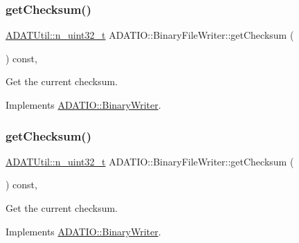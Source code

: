 \subsubsection{\texorpdfstring{getChecksum()}{getChecksum()}\hspace{0.1cm}{\footnotesize\ttfamily [2/3]}}
{\footnotesize\ttfamily \mbox{\hyperlink{namespaceADATUtil_ad945a8afa4db2d1f89b731964adae97e}{A\+D\+A\+T\+Util\+::n\+\_\+uint32\+\_\+t}} A\+D\+A\+T\+I\+O\+::\+Binary\+File\+Writer\+::get\+Checksum (\begin{DoxyParamCaption}{ }\end{DoxyParamCaption}) const\hspace{0.3cm}{\ttfamily [inline]}, {\ttfamily [virtual]}}



Get the current checksum. 



Implements \mbox{\hyperlink{classADATIO_1_1BinaryWriter_a8bebb70a7248b14c8a4dcf7aa49c1503}{A\+D\+A\+T\+I\+O\+::\+Binary\+Writer}}.

\mbox{\label{classADATIO_1_1BinaryFileWriter_ad6f9d995a02d4b3e8e12ad18972d58a5}} 
\subsubsection{\texorpdfstring{getChecksum()}{getChecksum()}\hspace{0.1cm}{\footnotesize\ttfamily [3/3]}}
{\footnotesize\ttfamily \mbox{\hyperlink{namespaceADATUtil_ad945a8afa4db2d1f89b731964adae97e}{A\+D\+A\+T\+Util\+::n\+\_\+uint32\+\_\+t}} A\+D\+A\+T\+I\+O\+::\+Binary\+File\+Writer\+::get\+Checksum (\begin{DoxyParamCaption}{ }\end{DoxyParamCaption}) const\hspace{0.3cm}{\ttfamily [inline]}, {\ttfamily [virtual]}}



Get the current checksum. 



Implements \mbox{\hyperlink{classADATIO_1_1BinaryWriter_a8bebb70a7248b14c8a4dcf7aa49c1503}{A\+D\+A\+T\+I\+O\+::\+Binary\+Writer}}.

\mbox{\label{classADATIO_1_1BinaryFileWriter_a2506200a774d4823088a0365e0452d9a}} 
